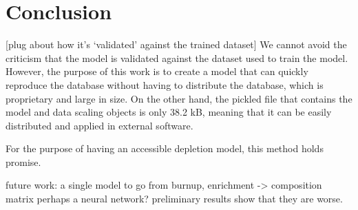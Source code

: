 \section{Conclusion}

[plug about how it's `validated' against the trained dataset]
We cannot avoid the criticism that the model is validated
against the dataset used to train the model. However, the purpose
of this work is to create a model that can quickly reproduce the
database without having to distribute the database, which is proprietary
and large in size. On the other hand, the pickled file that contains
the model and data scaling objects is only 38.2 kB, meaning that it
can be easily distributed and applied in external software.

For the purpose of having an accessible
depletion model, this method holds promise.


future work:
a single model to go from
burnup, enrichment -> composition matrix
perhaps a neural network? preliminary results
show that they are worse. 